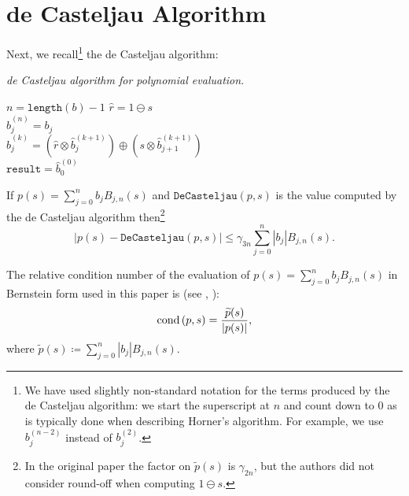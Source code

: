 \section{de Casteljau Algorithm}

Next, we recall\footnote{We have used slightly non-standard notation for the
terms produced by the de Casteljau algorithm: we start the superscript at
\(n\) and count down to \(0\) as is typically done when describing Horner's
algorithm. For example, we use \(b_j^{(n - 2)}\) instead of
\(b_j^{(2)}\).} the de Casteljau algorithm:

\begin{breakablealgorithm}
  \caption{\textit{de Casteljau algorithm for polynomial evaluation.}}
  \label{alg:de-casteljau}

  \begin{algorithmic}
      \State \(n = \texttt{length}(b) - 1\)
      \State \(\widehat{r} = 1 \ominus s\)
      \\
        \State \(\widehat{b}_j^{(n)} = b_j\)
      \EndFor
      \\
          \State \(\widehat{b}_j^{(k)} = \left(
              \widehat{r} \otimes \widehat{b}_j^{(k + 1)}\right) \oplus
              \left(s \otimes \widehat{b}_{j + 1}^{(k + 1)}\right)\)
        \EndFor
      \EndFor
      \\
      \State \(\mathtt{result} = \widehat{b}_0^{(0)}\)
    \EndFunction
  \end{algorithmic}
\end{breakablealgorithm}

\begin{theorem}
If \(p(s) = \sum_{j = 0}^n b_j B_{j, n}(s)\) and \(\mathtt{DeCasteljau}(p, s)\)
is the value computed by the de Casteljau algorithm then\footnote{In the
original paper the factor on \(\widetilde{p}(s)\) is \(\gamma_{2n}\),
but the authors did not consider round-off when computing
\(1 \ominus s\).}
\begin{equation}
\left|p(s) - \mathtt{DeCasteljau}(p, s)\right| \leq \gamma_{3n}
\sum_{j = 0}^n \left|b_j\right| B_{j, n}(s).
\end{equation}
\end{theorem}

The relative condition number of the evaluation of \(p(s) = \sum_{j = 0}^n
b_j B_{j, n}(s)\) in Bernstein form used in this paper is (see
\cite{Mainar1999}, \cite{Farouki1987}):
\begin{equation}
\operatorname{cond}\left(p, s\right) = \frac{\widetilde{p}(s)}{\left|p(s)\right|},
\end{equation}
where
\(\widetilde{p}(s) \coloneqq \sum_{j = 0}^n \left|b_j\right| B_{j, n}(s)\).

